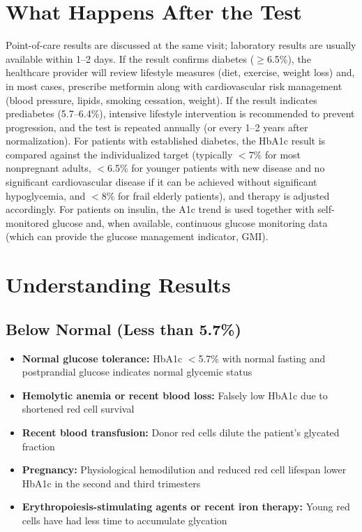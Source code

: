 \section*{What Happens After the Test}
Point-of-care results are discussed at the same visit; laboratory results are usually available within 1--2 days. If the result confirms diabetes ($\geq$6.5\%), the healthcare provider will review lifestyle measures (diet, exercise, weight loss) and, in most cases, prescribe metformin along with cardiovascular risk management (blood pressure, lipids, smoking cessation, weight). If the result indicates prediabetes (5.7--6.4\%), intensive lifestyle intervention is recommended to prevent progression, and the test is repeated annually (or every 1--2 years after normalization). For patients with established diabetes, the HbA1c result is compared against the individualized target (typically $<$7\% for most nonpregnant adults, $<$6.5\% for younger patients with new disease and no significant cardiovascular disease if it can be achieved without significant hypoglycemia, and $<$8\% for frail elderly patients), and therapy is adjusted accordingly. For patients on insulin, the A1c trend is used together with self-monitored glucose and, when available, continuous glucose monitoring data (which can provide the glucose management indicator, GMI).

\section*{Understanding Results}

\subsection*{Below Normal (Less than 5.7\%)}
\begin{itemize}
  \item \textbf{Normal glucose tolerance:} HbA1c $<$5.7\% with normal fasting and postprandial glucose indicates normal glycemic status
  \item \textbf{Hemolytic anemia or recent blood loss:} Falsely low HbA1c due to shortened red cell survival
  \item \textbf{Recent blood transfusion:} Donor red cells dilute the patient's glycated fraction
  \item \textbf{Pregnancy:} Physiological hemodilution and reduced red cell lifespan lower HbA1c in the second and third trimesters
  \item \textbf{Erythropoiesis-stimulating agents or recent iron therapy:} Young red cells have had less time to accumulate glycation
\end{itemize}

